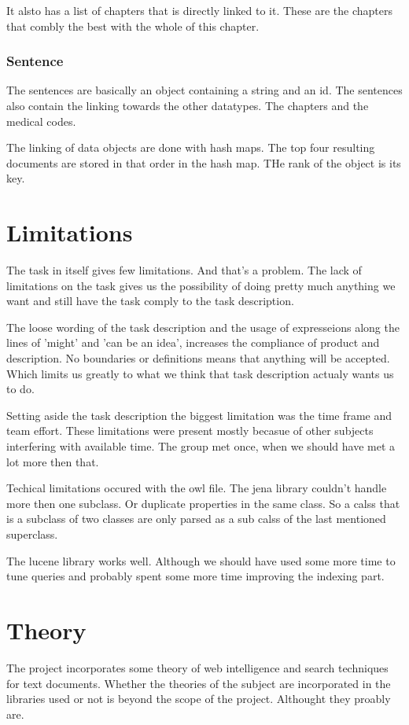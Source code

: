 \documentclass[12pt, a4paper]{article}
\begin{document}
It alsto has a list of chapters that is directly linked to it. These are the
chapters that combly the best with the whole of this chapter. 

\subsubsection{Sentence}
The sentences are basically an object containing a string and an id. 
The sentences also contain the linking towards the other datatypes. The
chapters and the medical codes.

The linking of data objects are done with hash maps. The top four resulting
documents are stored in that order in the hash map. THe rank of the object is
its key. 

\section{Limitations} 

The task in itself gives few limitations. And that's a problem. 
The lack of limitations on the task gives us the possibility of doing pretty
much anything we want and still have the task comply to the task description. 

The loose wording of the task description and the usage of expresseions along
the lines of 'might' and 'can be an idea', increases the compliance of product
and description. No boundaries or definitions means that anything will be
accepted. Which limits us greatly to what we think that task description
actualy wants us to do. 

Setting aside the task description the biggest limitation was the time frame
and team effort. These limitations were present mostly becasue of other
subjects interfering with available time. The group met once, when we should
have met a lot more then that. 

Techical limitations occured with the owl file. The jena library couldn't
handle more then one subclass. Or duplicate properties in the same class. So a
calss that is a subclass of two classes are only parsed as a sub calss of the
last mentioned superclass. 

The lucene library works well. Although we should have used some more time to
tune queries and probably spent some more time improving the indexing part. 

\section{Theory}
The project incorporates some theory of web intelligence and search techniques
for text documents. Whether the theories of the subject are incorporated in the
libraries used or not is beyond the scope of the project. 
Althought they proably are. 
\end{document}
